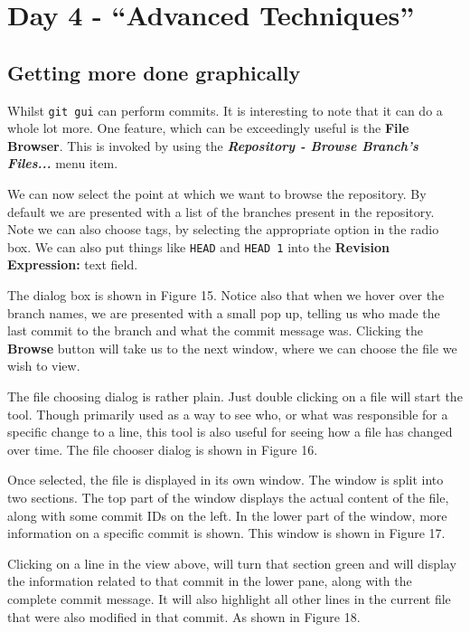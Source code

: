 \section{Day 4 - ``Advanced Techniques''}
\subsection{Getting more done graphically}
Whilst \texttt{git gui} can perform commits.
It is interesting to note that it can do a whole lot more.
One feature, which can be exceedingly useful is the \textbf{File Browser}.
This is invoked by using the \textbf{\emph{Repository - Browse Branch's Files...}} menu item.

We can now select the point at which we want to browse the repository.
By default we are presented with a list of the branches present in the repository.
Note we can also choose tags, by selecting the appropriate option in the radio box.
We can also put things like \texttt{HEAD} and \texttt{HEAD~1} into the \textbf{Revision Expression:} text field.

The dialog box is shown in Figure 15.
Notice also that when we hover over the branch names, we are presented with a small pop up, telling us who made the last commit to the branch and what the commit message was.
Clicking the \textbf{Browse} button will take us to the next window, where we can choose the file we wish to view.


The file choosing dialog is rather plain.
Just double clicking on a file will start the  tool.
Though primarily used as a way to see who, or what was responsible for a specific change to a line, this tool is also useful for seeing how a file has changed over time.
The file chooser dialog is shown in Figure 16.


Once selected, the file is displayed in its own window.
The window is split into two sections.
The top part of the window displays the actual content of the file, along with some commit IDs on the left.
In the lower part of the window, more information on a specific commit is shown.
This window is shown in Figure 17.


Clicking on a line in the view above, will turn that section green and will display the information related to that commit in the lower pane, along with the complete commit message.
It will also highlight all other lines in the current file that were also modified in that commit.
As shown in Figure 18.

